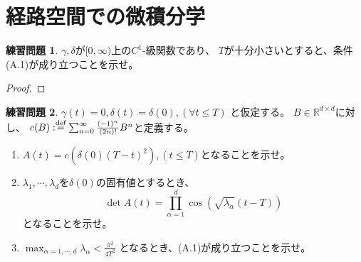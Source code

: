 \documentclass[uplatex]{jsarticle}
\theoremstyle{definition}
\newtheorem{prob}[prob]{練習問題}
\def\R{\mathbb{R}}
\def\dfn{:\overset{\mbox{{\scriptsize def}}}{=}}
\begin{document}
\newpage
\section{経路空間での微積分学}
\label{section 7}

\begin{prob}\label{prob: 7.1}
  \(\gamma,\delta\)が\([0,\infty)\)上の\(C^1\)-級関数であり、
  \(T\)が十分小さいとすると、条件(A.1)が成り立つことを示せ。
\end{prob}

\begin{proof}
\end{proof}

\begin{prob}\label{prob: 7.2}
  \(\gamma(t) = 0, \delta(t) = \delta(0) , (\forall t\leq T)\)
  と仮定する。
  \(B\in \R^{d\times d}\)に対し、
  \(c(B) \dfn \sum_{n=0}^\infty \frac{(-1)^n}{(2n)!}B^n\)と定義する。
  \begin{enumerate}
    \item \label{enumi: prob: 7.2-1}
    \(A(t) = c(\delta(0)(T-t)^2) , (t\leq T)\)となることを示せ。
    \item \label{enumi: prob: 7.2-2}
    \(\lambda_1,\cdots,\lambda_d\)を\(\delta(0)\)の固有値とするとき、
    \[
    \det A(t) = \prod_{\alpha = 1}^d \cos \left( \sqrt{\lambda_\alpha}(t-T)\right)
    \]
    となることを示せ。
    \item \label{enumi: prob: 7.2-3}
    \(\max_{\alpha=1,\cdots,d}\lambda_\alpha < \frac{\pi^2}{4T^2}\)
    となるとき、(A.1)が成り立つことを示せ。
  \end{enumerate}
\end{prob}
\end{document}
